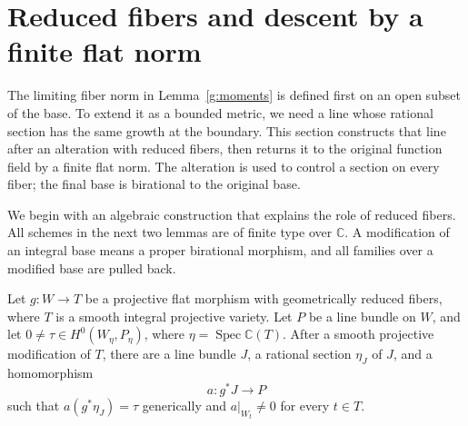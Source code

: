 \section{Reduced fibers and descent by a finite flat norm}
\label{g:reduced-flat}

The limiting fiber norm in Lemma~\ref{g:moments} is defined first on
an open subset of the base.  To extend it as a bounded metric, we need a
line whose rational section has the same growth at the boundary.  This
section constructs that line after an alteration with reduced fibers,
then returns it to the original function field by a finite flat norm.
The alteration is used to control a section on every fiber; the final
base is birational to the original base.

We begin with an algebraic construction that explains the role of
reduced fibers.  All schemes in the next two lemmas are of finite type
over \(\mathbb C\).  A modification of an integral base means a proper
birational morphism, and all families over a modified base are pulled
back.

\begin{lemma}
\label{g:flat-section-line}
Let \(g:W\to T\) be a projective flat morphism with geometrically reduced
fibers, where \(T\) is a smooth integral projective variety.  Let \(P\)
be a line bundle on \(W\), and let
\(0\ne\tau\in H^0(W_{\eta},P_{\eta})\), where
\(\eta=\operatorname{Spec}\mathbb C(T)\).
After a smooth projective modification of \(T\), there are a line bundle
\(J\), a rational section \(\eta_J\) of \(J\), and a homomorphism
\[
                 a:g^*J\longrightarrow P
\]
such that \(a(g^*\eta_J)=\tau\) generically and
\(a|_{W_t}\ne0\) for every \(t\in T\).
\end{lemma}

